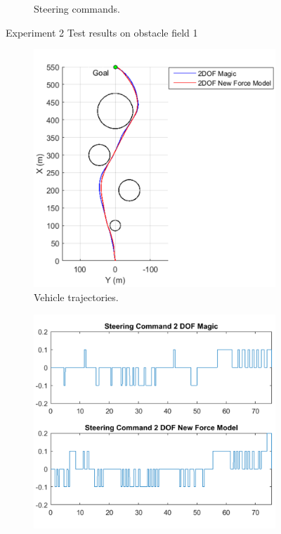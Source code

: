 \documentclass[12pt,onecolumn]{report}
\begin{document}
\begin{figure}
\begin{subfigure}[b]{0.49\columnwidth}
		\caption{\small Steering commands.}   
		\label{fig:SteeringCommandsField1Exp2}
	\end{subfigure}
	\caption{\small Experiment 2 Test results on obstacle field 1}
	\label{fig:Obst1TestDataExp2}
\end{figure}

\begin{figure}
	\centering
	\begin{subfigure}[b]{0.49\columnwidth}
		\centering
		\includegraphics[height=\columnwidth]{Figs/Field2MagicvBekkerTrajectories_cropped.png}
		\caption{{\small Vehicle trajectories.}}   
		\label{fig:ObstacleField2TrajectoriesExp2}
	\end{subfigure}
	\hfill
	\begin{subfigure}[b]{0.49\columnwidth}
		\centering
		\includegraphics[width=\columnwidth]{Figs/Field2MagicvBekkerSteeringCommands_cropped.png}

\end{subfigure}
\end{figure}
\end{document}
